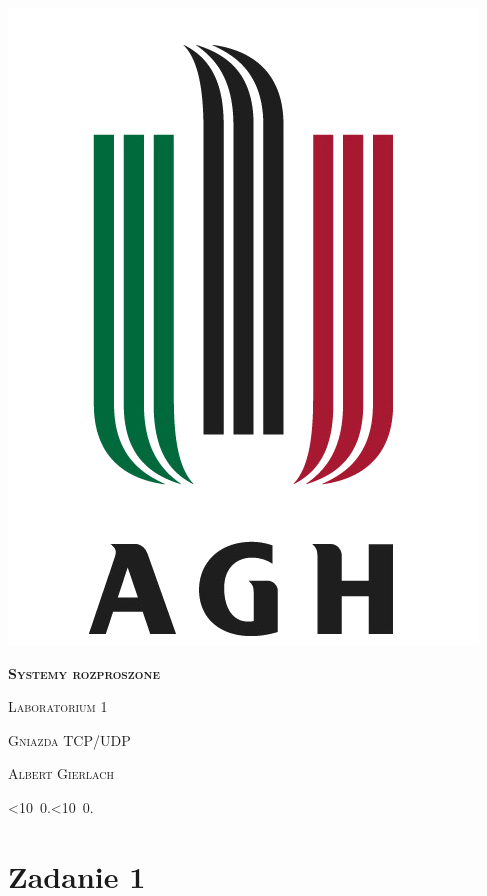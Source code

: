 \documentclass[12pt]{article}
\def\mydate{\leavevmode\hbox{\twodigits\day.\twodigits\month.\the\year}}
\def\twodigits#1{\ifnum#1<10 0\fi\the#1}
\begin{document}
\thispagestyle{empty}
\begin{center}
\begin{minipage}{0.75\linewidth}
    \centering
    \includegraphics[width=0.45\linewidth]{agh_logo2.png}
    \par
    \vspace{2cm}
    {\bfseries{\scshape{\Huge  Systemy rozproszone}}}
    \par
    \vspace{1.7cm}
    {\scshape{\Large Laboratorium 1}}
    \par
    \vspace{0.8cm}
    {\scshape{\Large Gniazda TCP/UDP}}
    \par
    \vspace{3cm}

    {\scshape{\Large Albert Gierlach}}\par
    \vspace{1cm}

    {\Large \mydate}
\end{minipage}
\end{center}
\clearpage



\section{Zadanie 1}
\end{document}
